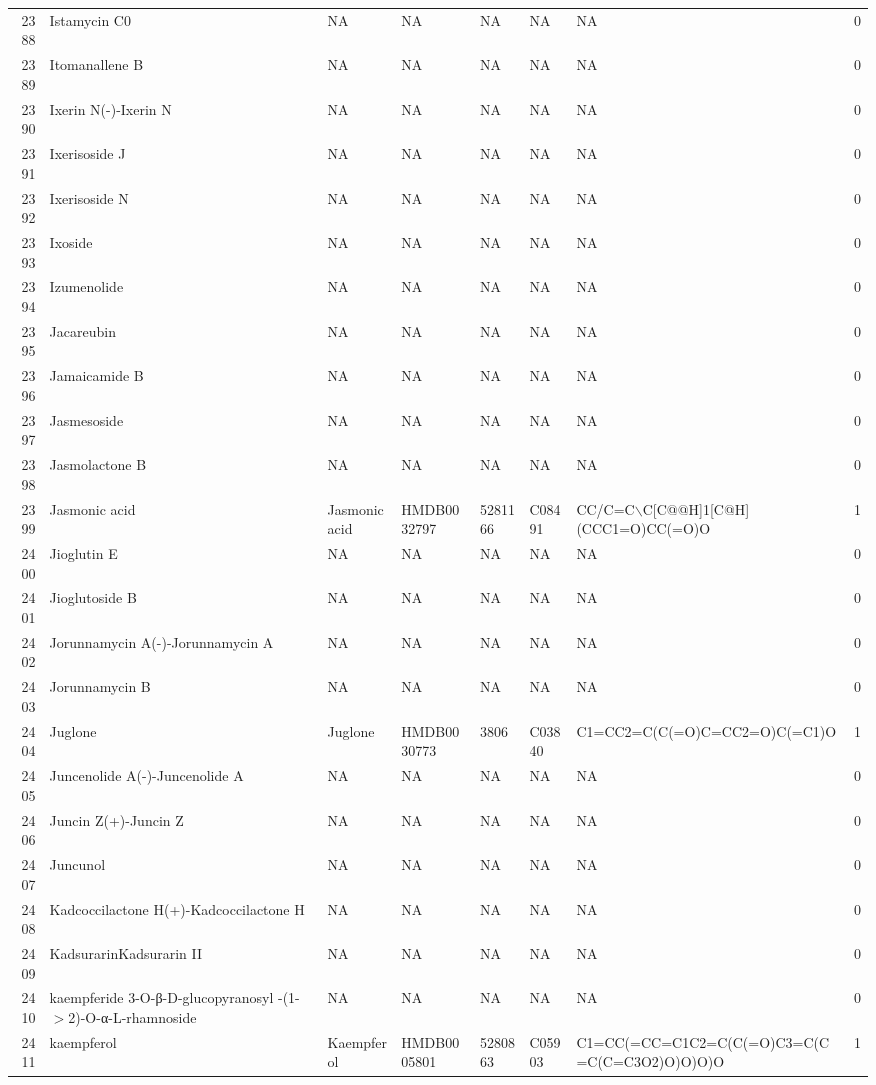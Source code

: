 \documentclass[a4paper]{article}
\begin{document}
\begin{longtable}{rlllllll}
  2388 & Istamycin C0 & NA & NA & NA & NA & NA & 0 \\ 
  2389 & Itomanallene B & NA & NA & NA & NA & NA & 0 \\ 
  2390 & Ixerin N(-)-Ixerin N & NA & NA & NA & NA & NA & 0 \\ 
  2391 & Ixerisoside J & NA & NA & NA & NA & NA & 0 \\ 
  2392 & Ixerisoside N & NA & NA & NA & NA & NA & 0 \\ 
  2393 & Ixoside & NA & NA & NA & NA & NA & 0 \\ 
  2394 & Izumenolide & NA & NA & NA & NA & NA & 0 \\ 
  2395 & Jacareubin & NA & NA & NA & NA & NA & 0 \\ 
  2396 & Jamaicamide B & NA & NA & NA & NA & NA & 0 \\ 
  2397 & Jasmesoside & NA & NA & NA & NA & NA & 0 \\ 
  2398 & Jasmolactone B & NA & NA & NA & NA & NA & 0 \\ 
  2399 & Jasmonic acid & Jasmonic acid & HMDB0032797 & 5281166 & C08491 & CC/C=C$\backslash$C[C@@H]1[C@H](CCC1=O)CC(=O)O & 1 \\ 
  2400 & Jioglutin E & NA & NA & NA & NA & NA & 0 \\ 
  2401 & Jioglutoside B & NA & NA & NA & NA & NA & 0 \\ 
  2402 & Jorunnamycin A(-)-Jorunnamycin A & NA & NA & NA & NA & NA & 0 \\ 
  2403 & Jorunnamycin B & NA & NA & NA & NA & NA & 0 \\ 
  2404 & Juglone & Juglone & HMDB0030773 & 3806 & C03840 & C1=CC2=C(C(=O)C=CC2=O)C(=C1)O & 1 \\ 
  2405 & Juncenolide A(-)-Juncenolide A & NA & NA & NA & NA & NA & 0 \\ 
  2406 & Juncin Z(+)-Juncin Z & NA & NA & NA & NA & NA & 0 \\ 
  2407 & Juncunol & NA & NA & NA & NA & NA & 0 \\ 
  2408 & Kadcoccilactone H(+)-Kadcoccilactone H & NA & NA & NA & NA & NA & 0 \\ 
  2409 & KadsurarinKadsurarin II & NA & NA & NA & NA & NA & 0 \\ 
  2410 & kaempferide 3-O-β-D-glucopyranosyl -(1-$>$2)-O-α-L-rhamnoside & NA & NA & NA & NA & NA & 0 \\ 
  2411 & kaempferol & Kaempferol & HMDB0005801 & 5280863 & C05903 & C1=CC(=CC=C1C2=C(C(=O)C3=C(C=C(C=C3O2)O)O)O)O & 1 \\ 

\end{longtable}
\end{document}

